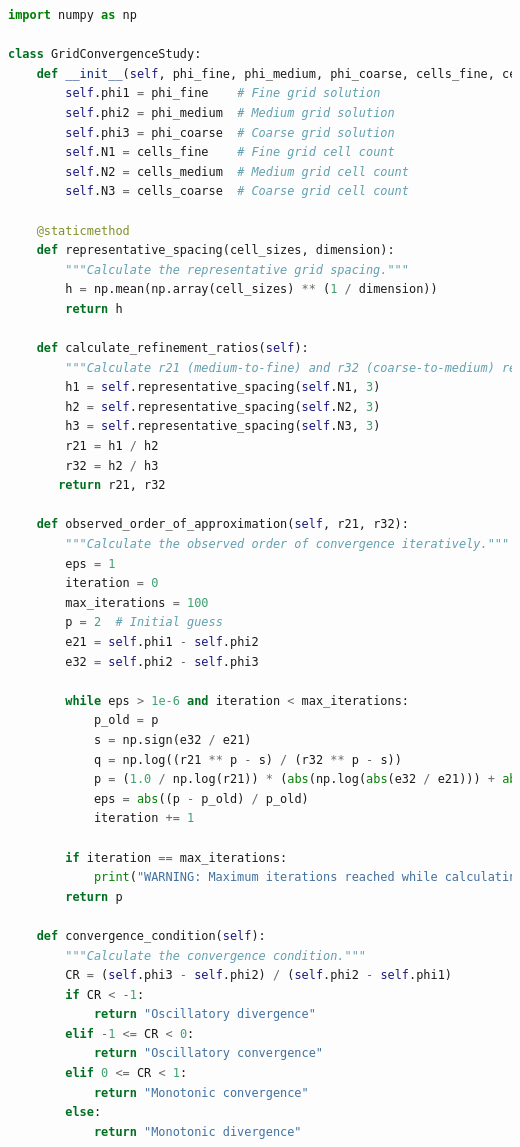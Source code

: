\documentclass[12pt]{article}
\begin{document}
\begin{lstlisting}[language=Python, caption=Python script used to perform grid convergence analysis., label=lst:gca]
import numpy as np

class GridConvergenceStudy:
    def __init__(self, phi_fine, phi_medium, phi_coarse, cells_fine, cells_medium, cells_coarse):
        self.phi1 = phi_fine    # Fine grid solution
        self.phi2 = phi_medium  # Medium grid solution
        self.phi3 = phi_coarse  # Coarse grid solution
        self.N1 = cells_fine    # Fine grid cell count
        self.N2 = cells_medium  # Medium grid cell count
        self.N3 = cells_coarse  # Coarse grid cell count

    @staticmethod
    def representative_spacing(cell_sizes, dimension):
        """Calculate the representative grid spacing."""
        h = np.mean(np.array(cell_sizes) ** (1 / dimension))
        return h

    def calculate_refinement_ratios(self):
        """Calculate r21 (medium-to-fine) and r32 (coarse-to-medium) refinement ratios."""
        h1 = self.representative_spacing(self.N1, 3)
        h2 = self.representative_spacing(self.N2, 3)
        h3 = self.representative_spacing(self.N3, 3)
        r21 = h1 / h2
        r32 = h2 / h3
       return r21, r32

    def observed_order_of_approximation(self, r21, r32):
        """Calculate the observed order of convergence iteratively."""
        eps = 1
        iteration = 0
        max_iterations = 100
        p = 2  # Initial guess
        e21 = self.phi1 - self.phi2
        e32 = self.phi2 - self.phi3

        while eps > 1e-6 and iteration < max_iterations:
            p_old = p
            s = np.sign(e32 / e21)
            q = np.log((r21 ** p - s) / (r32 ** p - s))
            p = (1.0 / np.log(r21)) * (abs(np.log(abs(e32 / e21))) + abs(q))
            eps = abs((p - p_old) / p_old)
            iteration += 1

        if iteration == max_iterations:
            print("WARNING: Maximum iterations reached while calculating observed order.")
        return p

    def convergence_condition(self):
        """Calculate the convergence condition."""
        CR = (self.phi3 - self.phi2) / (self.phi2 - self.phi1)
        if CR < -1:
            return "Oscillatory divergence"
        elif -1 <= CR < 0:
            return "Oscillatory convergence"
        elif 0 <= CR < 1:
            return "Monotonic convergence"
        else:
            return "Monotonic divergence"


\end{lstlisting}
\end{document}
